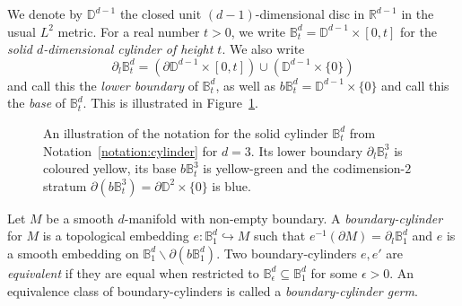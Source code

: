 \documentclass[AHL,Unicode,published]{cedram}
\newcommand{\bB}{\mathbb{B}}
\newcommand{\bD}{\mathbb{D}}
\newcommand{\bR}{\mathbb{R}}
\begin{document}
\begin{nota}\label{notation:cylinder}
We denote by $\bD^{d-1}$ the closed unit $(d-1)$-dimensional disc in $\bR^{d-1}$ in the usual $L^2$ metric. For a real number $t > 0$, we write $\bB^d_t = \bD^{d-1} \times [0,t]$ for the \emph{solid $d$-dimensional cylinder of height $t$}. We also write
\[
\partial_{l} \bB^d_t = \left(\partial \bD^{d-1} \times [0,t]\right) \cup \left(\bD^{d-1} \times \{0\}\right)
\]
and call this the \emph{lower boundary} of $\bB^d_t$, as well as $b\bB^d_t = \bD^{d-1} \times \{0\}$ and call this the \emph{base} of $\bB^d_t$. This is illustrated in Figure~\ref{fig:boundary-cylinder}.
\end{nota}

\begin{figure}[t]
\centering
{}
\caption{An illustration of the notation for the solid cylinder $\bB^d_t$ from Notation~\ref{notation:cylinder} for $d=3$. Its lower boundary $\partial_{l} \bB^3_t$ is coloured yellow, its base $b\bB^3_t$ is yellow-green and the codimension-$2$ stratum $\partial (b\bB^3_t) = \partial \bD^{2} \times \{0\}$ is blue.}\label{fig:boundary-cylinder}
\end{figure}

\begin{defi}\label{def:boundary-cylinder}
Let $M$ be a smooth $d$-manifold with non-empty boundary. A \emph{boundary-cylinder} for $M$ is a topological embedding $e \colon \bB^d_{1} \hookrightarrow M$ such that $e^{-1}(\partial M) = \partial_{l} \bB^d_{1}$ and $e$ is a smooth embedding on $\bB^d_{1} \smallsetminus \partial(b\bB^d_{1})$. Two boundary-cylinders $e,e'$ are \emph{equivalent} if they are equal when restricted to $\bB^d_\epsilon \subseteq \bB^d_{1}$ for some $\epsilon > 0$. An equivalence class of boundary-cylinders is called a \emph{boundary-cylinder germ}.
\end{defi}
\end{document}
